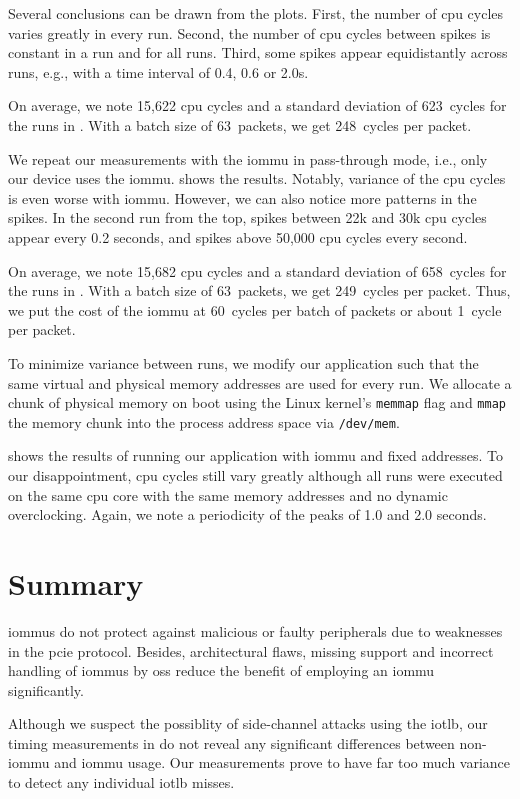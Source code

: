 Several conclusions can be drawn from the plots. First, the number of \ac{cpu}
cycles varies greatly in every run. Second, the number of \ac{cpu} cycles
between spikes is constant in a run and for all runs. Third, some spikes appear
equidistantly across runs, e.g., with a time interval of 0.4, 0.6 or 2.0s.

On average, we note 15,622 \ac{cpu} cycles and a standard deviation of
623~cycles for the runs in . With a batch size of
63~packets, we get 248~cycles per packet.

We repeat our measurements with the \ac{iommu} in pass-through mode, i.e., only
our device uses the \ac{iommu}.  shows the results.
Notably, variance of the \ac{cpu} cycles is even worse with \ac{iommu}. However,
we can also notice more patterns in the spikes. In the second run from the top,
spikes between 22k and 30k \ac{cpu} cycles appear every 0.2 seconds, and spikes
above 50,000 \ac{cpu} cycles every second.

On average, we note 15,682 \ac{cpu} cycles and a standard deviation of
658~cycles for the runs in . With a batch size of
63~packets, we get 249~cycles per packet. Thus, we put the cost of the
\ac{iommu} at 60~cycles per batch of packets or about 1~cycle per packet.

To minimize variance between runs, we modify our application such that the same
virtual and physical memory addresses are used for every run. We allocate a
chunk of physical memory on boot using the Linux kernel's \texttt{memmap} flag
and \texttt{mmap} the memory chunk into the process address space via
\texttt{/dev/mem}.

 shows the results of running our application
with \ac{iommu} and fixed addresses. To our disappointment, \ac{cpu} cycles
still vary greatly although all runs were executed on the same \ac{cpu} core
with the same memory addresses and no dynamic overclocking. Again, we note a
periodicity of the peaks of 1.0 and 2.0 seconds.

\section{Summary}
\label{sec:sec_summary}

\acp{iommu} do not protect against malicious or faulty peripherals due to
weaknesses in the \ac{pcie} protocol. Besides, architectural flaws, missing
support and incorrect handling of \acp{iommu} by \aclp{os} reduce the benefit of
employing an \ac{iommu} significantly.

Although we suspect the possiblity of side-channel attacks using the \ac{iotlb},
our timing measurements in  do not reveal any significant
differences between non-\ac{iommu} and \ac{iommu} usage. Our measurements prove
to have far too much variance to detect any individual \ac{iotlb} misses.

